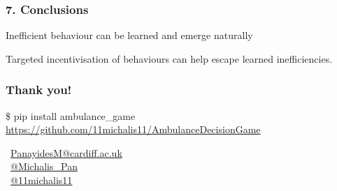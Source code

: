 \begin{frame}
    \frametitle{7. Conclusions}
    \centering
    \Large

    Inefficient behaviour can be learned and emerge naturally

    \vspace{1cm}

    Targeted incentivisation of behaviours can help escape learned inefficiencies.

\end{frame}

\begin{frame}
    \frametitle{\Large{Thank you!}}
    \centering


    \vspace{1cm}
    \small{\$ pip install ambulance\_game}
    \small{\url{https://github.com/11michalis11/AmbulanceDecisionGame}}


    \vspace{1.5cm}
    \faEnvelope \, \url{PanayidesM@cardiff.ac.uk} \\
    \faTwitterSquare \, \url{@Michalis_Pan} \\
    \faGithubSquare \, \url{@11michalis11} \\

\end{frame}


